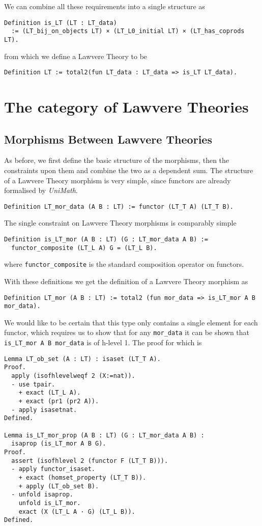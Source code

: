 We can combine all these requirements into a single structure as
\begin{lstlisting}
Definition is_LT (LT : LT_data)
  := (LT_bij_on_objects LT) × (LT_L0_initial LT) × (LT_has_coprods LT).
\end{lstlisting}
from which we define a Lawvere Theory to be
\begin{lstlisting}
Definition LT := total2(fun LT_data : LT_data => is_LT LT_data).
\end{lstlisting}

\section{The category of Lawvere Theories}
\subsection{Morphisms Between Lawvere Theories}
As before, we first define the basic structure of the morphisms, then the
constraints upon them and combine the two as a dependent sum. The structure of a
Lawvere Theory morphism is very simple, since functors are already formalised by
\textit{UniMath}.
\begin{lstlisting}
Definition LT_mor_data (A B : LT) := functor (LT_T A) (LT_T B).
\end{lstlisting}

The single constraint on Lawvere Theory morphisms is comparably simple
\begin{lstlisting}
Definition is_LT_mor (A B : LT) (G : LT_mor_data A B) := 
  functor_composite (LT_L A) G = (LT_L B).
\end{lstlisting}
where \lstinline|functor_composite| is the standard composition operator on functors.

With these definitions we get the definition of a Lawvere Theory morphism as
\begin{lstlisting}
Definition LT_mor (A B : LT) := total2 (fun mor_data => is_LT_mor A B mor_data).
\end{lstlisting}

We would like to be certain that this type only contains a single element for
each functor, which requires us to show that for any \lstinline|mor_data| it can
be shown that \lstinline|is_LT_mor A B mor_data| is of h-level 1. The proof for
which is
\begin{lstlisting}
Lemma LT_ob_set (A : LT) : isaset (LT_T A).
Proof.
  apply (isofhlevelweqf 2 (X:=nat)).
  - use tpair.
    + exact (LT_L A).
    + exact (pr1 (pr2 A)).
  - apply isasetnat.
Defined.

Lemma is_LT_mor_prop (A B : LT) (G : LT_mor_data A B) : 
  isaprop (is_LT_mor A B G).
Proof.
  assert (isofhlevel 2 (functor F (LT_T B))).
  - apply functor_isaset.
    + exact (homset_property (LT_T B)).
    + apply (LT_ob_set B).
  - unfold isaprop.
    unfold is_LT_mor.
    exact (X (LT_L A · G) (LT_L B)).
Defined.
\end{lstlisting}

